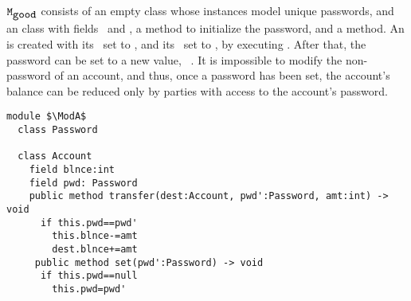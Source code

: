 {%
$\mbox{\normalfont{\texttt{M}}}_{\mbox{\normalfont{\texttt{good}}}}$ consists of an empty class   whose instances model  unique passwords}, and an  class with fields  \password~and  \balance, a  method to initialize the password, and  a  method. 
An  is created with its \balance~set to , and its \password~set to , \eg by executing .
 After that, the password can be set to a new value,  \eg\,   . 
It is impossible to modify the  non- password of an account, and thus, once a password has been set, the account's  {balance} {can be reduced only 
by parties with access to the account's password.}
 

\begin{lstlisting}[mathescape=true, language=Chainmail, frame=lines]
module $\ModA$        
  class Password
  
  class Account
    field blnce:int 
    field pwd: Password
    public method transfer(dest:Account, pwd':Password, amt:int) -> void
      if this.pwd==pwd'
        this.blnce-=amt
        dest.blnce+=amt
     public method set(pwd':Password) -> void
      if this.pwd==null
        this.pwd=pwd'
\end{lstlisting}
%
\noindent 
%
 
